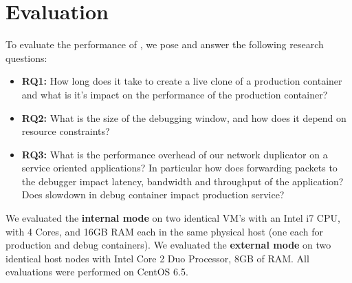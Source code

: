 \section{Evaluation}
\label{sec:parikshanEvaluation}

To evaluate the performance of \parikshan, we pose and answer the following research questions:

\begin{itemize}
\item \textbf{RQ1:} How long does it take to create a live clone of a production container and what is it's impact on the performance of the production container?
\item \textbf{RQ2:} What is the size of the debugging window, and how does it depend on resource constraints? 
\item \textbf{RQ3:} What is the performance overhead of our network duplicator on a service oriented applications? In particular how does forwarding packets to the debugger impact latency, bandwidth and throughput of the application? Does slowdown in debug container impact production service? 
\end{itemize}

We evaluated the \textbf{internal mode} on two identical VM's with an Intel i7 CPU, with 4 Cores, and 16GB RAM each in the same physical host (one each for production and debug containers).
We evaluated the \textbf{external mode} on two identical host nodes with Intel Core 2 Duo Processor, 8GB of RAM.
All evaluations were performed on CentOS 6.5.


